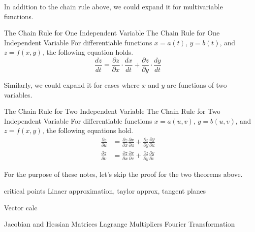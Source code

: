\documentclass[../main.tex]{subfiles}
\begin{document}
In addition to the chain rule above, we could expand it for
multivariable functions.

\begin{theorem}
{The Chain Rule for One Independent Variable}
{The Chain Rule for One Independent Variable}
For differentiable functions $x = a(t)$, $y = b(t)$, and
$z = f(x, y)$, the following equation holds.
\[
\frac{dz}{dt}
= \frac{\partial z}{\partial x} \cdot \frac{dx}{dt} +
    \frac{\partial z}{\partial y} \cdot \frac{dy}{dt}
\]
\end{theorem}

Similarly, we could expand it for cases where $x$ and $y$ are
functions of two variables.

\begin{theorem}
{The Chain Rule for Two Independent Variable}
{The Chain Rule for Two Independent Variable}
For differentiable functions $x = a(u, v)$, $y = b(u, v)$,
and $z = f(x, y)$, the following equations hold.
\begin{align*}
    \frac{\partial z}{\partial u}
    &= \frac{\partial z}{\partial x} \frac{\partial x}{\partial u} +
        \frac{\partial z}{\partial y} \frac{\partial y}{\partial u} \\
    \frac{\partial z}{\partial v}
    &= \frac{\partial z}{\partial x} \frac{\partial x}{\partial v} +
        \frac{\partial z}{\partial y} \frac{\partial y}{\partial v}
\end{align*}
\end{theorem}

For the purpose of these notes, let's skip the proof for the two
theorems above.



critical points
Linaer approximation, taylor approx, tangent planes

Vector calc

Jacobian and Hessian Matrices
Lagrange Multipliers
Fourier Transformation
\end{document}

